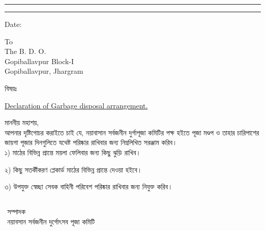 
\begin{center}
    \myheader 
    \end{center}
    \hrule \vspace*{2pt} \hrule  \vspace*{20pt}
    \begin{adjustwidth}{15mm}{15mm}\large 
        \begin{flushright} 
            Date: \underline{\datecontainer}
        \end{flushright}\large\vspace{1cm}
        
        \noindent To\\
        The B. D. O.\\
        Gopiballavpur Block-I\\
        Gopiballavpur, Jhargram 
        
        \vspace{.5cm}
        
        \noindent\begin{minipage}{.1\textwidth}বিষয়ঃ 
        \end{minipage}\begin{minipage}{.8\textwidth} 
            \underline{
                Declaration of Garbage disposal arrangement.  
            }
        \end{minipage}
        \vspace{.5cm}
        
        \noindent মাননীয় মহাশয়,\\
        \hspace*{1.5cm} 
        আপনার দৃষ্টিগোচর করাইতে চাই যে, নয়াবাসান সর্বজনীন দুর্গাপূজা কমিটির পক্ষ হইতে পূজা মণ্ডপ ও তাহার চারিপাশের জায়গা পূজার দিনগুলিতে যথেষ্ট পরিষ্কার রাখিবার জন্য নিম্নলিখিত সরঞ্জাম করিব।  \\
        
        ১) মাঠের বিভিন্ন প্রান্তে ময়লা ফেলিবার জন্য কিছু ঝুড়ি রাখিব। 
        
        ২) কিছু সতর্কীকরণ প্লেকার্ড মাঠের বিভিন্ন প্রান্তে দেওয়া হইবে। 
        
        ৩) উপযুক্ত স্বেচ্ছা সেবক বাহিনী পরিবেশ পরিষ্কার রাখিবার জন্য নিযুক্ত করিব।     
        
        
        
        
        \vspace{2ex}
        \begin{flushright}
            $\begin{array}{c}
            \\ \\ \\
            \mbox{সম্পাদক}\\\mbox{নয়াবসান সর্বজনীন দুর্গোৎসব পূজা কমিটি}\end{array}$
        \end{flushright}
    \end{adjustwidth}